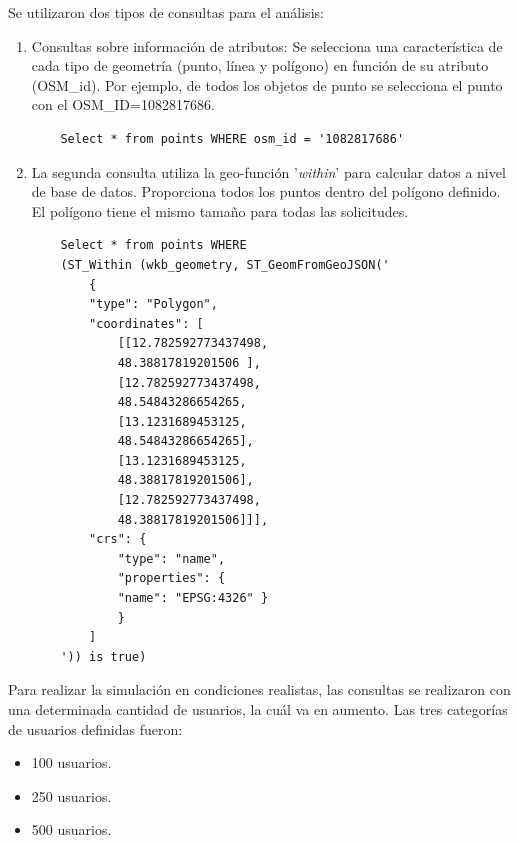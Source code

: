 \documentclass[pdflatex,sn-mathphys-num]{sn-jnl}
\theoremstyle{thmstyleone}%
\theoremstyle{thmstyletwo}%
\theoremstyle{thmstylethree}%
\begin{document}
\vspace{-0.7cm}

Se utilizaron dos tipos de consultas para el análisis:

\begin{enumerate}
    \item Consultas sobre información de atributos: Se selecciona una característica de cada tipo de geometría (punto, línea y polígono) en función de su atributo (OSM\_id). Por ejemplo, de todos los objetos de punto se selecciona el punto con el OSM\_ID=1082817686.

    \begin{verbatim}
    Select * from points WHERE osm_id = '1082817686'
    \end{verbatim}

    \vspace{-0.4cm}
    
    \item La segunda consulta utiliza la geo-función '\textit{within}' para calcular datos a nivel de base de datos. Proporciona todos los puntos dentro del polígono definido. El polígono tiene el mismo tamaño para todas las solicitudes.

    \newpage
    
    \begin{verbatim}
    Select * from points WHERE
    (ST_Within (wkb_geometry, ST_GeomFromGeoJSON('
        {
        "type": "Polygon",
        "coordinates": [
            [[12.782592773437498,
            48.38817819201506 ],
            [12.782592773437498,
            48.54843286654265,
            [13.1231689453125,
            48.54843286654265],
            [13.1231689453125,
            48.38817819201506],
            [12.782592773437498,
            48.38817819201506]]],
        "crs": {
            "type": "name",
            "properties": {
            "name": "EPSG:4326" } 
            } 
        ]
    ')) is true)
    \end{verbatim}
\end{enumerate}

Para realizar la simulación en condiciones realistas, las consultas se realizaron con una determinada cantidad de usuarios, la cuál va en aumento. Las tres categorías de usuarios definidas fueron:

\begin{itemize}
    \item 100 usuarios.
    \item 250 usuarios.
    \item 500 usuarios.
\end{itemize}
\end{document}
